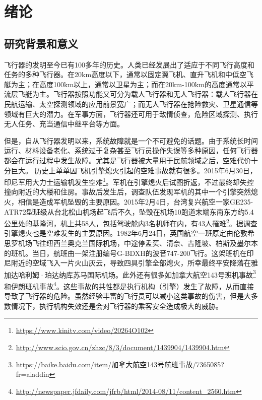 
\chapter{绪论}
\label{chap:introduction}

\section{研究背景和意义}
飞行器的发明至今已有100多年的历史。人类已经发展出了适应于不同飞行高度和任务的多种飞行器。在20km高度以下，通常以固定翼飞机、直升飞机和中低空飞艇为主；在高度100km以上，通常以卫星为主；而在20km-100km的高度通常以平流层飞艇为主。飞行器按照功能又可分为载人飞行器和无人飞行器：载人飞行器在民航运输、太空探测领域的应用前景宽广；而无人飞行器在抢险救灾、卫星通信等领域有巨大的潜力。在军事方面，飞行器还可用于敌情侦查，危险区域探测、执行无人任务、充当通信中继平台等方面。

但是，自从飞行器发明以来，系统故障就是一个不可避免的话题。由于系统长时间运行、材料设备老化、系统过于复杂甚至飞行员操作失误等多种原因，任何飞行器都会在运行过程中发生故障。尤其是飞行器被大量用于民航领域之后，空难代价十分巨大。 历史上单单因飞机引擎熄火引起的空难事故就有很多。2015年6月30日，印尼军用大力士运输机发生空难\footnote{\url{https://www.kinitv.com/video/20264O102}}。军机在引擎熄火后试图折返，不过最终却失控撞向附近的大楼和住房。事故后发生后，调查队伍发现军机的其中一个引擎突然熄火，相信是造成军机坠毁的主要原因。2015年2月4日，台湾复兴航空一家GE235-ATR72型班级从台北松山机场起飞后不久，坠毁在机场10跑道末端东南东方约5.4公里处的基隆河，机上共58人，包括驾驶舱内3名机师在内，有43人罹难\footnote{\url{http://www.scio.gov.cn/zhzc/8/3/document/1439904/1439904.htm}}。据调查引擎熄火也是空难发生的主要原因。1982年6月24日，英国航空一班原定由伦敦希思罗机场飞往纽西兰奥克兰国际机场，中途停孟买、清奈、吉隆坡、柏斯及墨尔本的班机。当日，航班由一架注册编号G-BDXH的波音747-200飞行。这架班机在印尼附近的空域飞入一片火山灰云，导致四具引擎全部熄火，所幸最终平安降落在雅加达哈利姆·珀达纳库苏马国际机场。此外还有很多如加拿大航空143号班机事故\footnote{https://baike.baidu.com/item/加拿大航空143号航班事故/7365085?fr=aladdin}和伊朗班机事故\footnote{\url{http://newspaper.jfdaily.com/jfrb/html/2014-08/11/content_2560.htm}}。这些事故的共性都是执行机构（引擎）发生了故障，从而直接导致了飞行器的危险。虽然经验丰富的飞行员可以减小这类事故的伤害，但是大多数情况下，执行机构失效还是会对飞行器的乘客安全造成极大的威胁。

